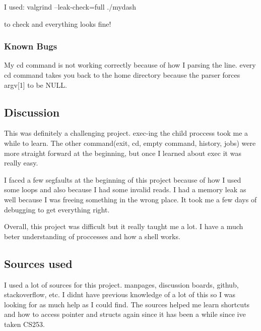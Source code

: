 I used\+: valgrind --leak-\/check=full ./mydash

to check and everything looks fine!

\subsubsection*{Known Bugs}

My cd command is not working correctly because of how I parsing the line. every cd command takes you back to the home directory because the parser forces argv\mbox{[}1\mbox{]} to be N\+U\+L\+L.

\subsection*{Discussion}

This was definitely a challenging project. exec-\/ing the child proccess took me a while to learn. The other command(exit, cd, empty command, history, jobs) were more straight forward at the beginning, but once I learned about exec it was really easy.

I faced a few segfaults at the beginning of this project because of how I used some loops and also because I had some invalid reads. I had a memory leak as well because I was freeing something in the wrong place. It took me a few days of debugging to get everything right.

Overall, this project was difficult but it really taught me a lot. I have a much beter understanding of proccesses and how a shell works.

\subsection*{Sources used}

I used a lot of sources for this project. manpages, discussion boards, github, stackoverflow, etc. I didn\textquotesingle{}t have previous knowledge of a lot of this so I was looking for as much help as I could find. The sources helped me learn shortcuts and how to access pointer and structs again since it has been a while since ive taken C\+S253. 